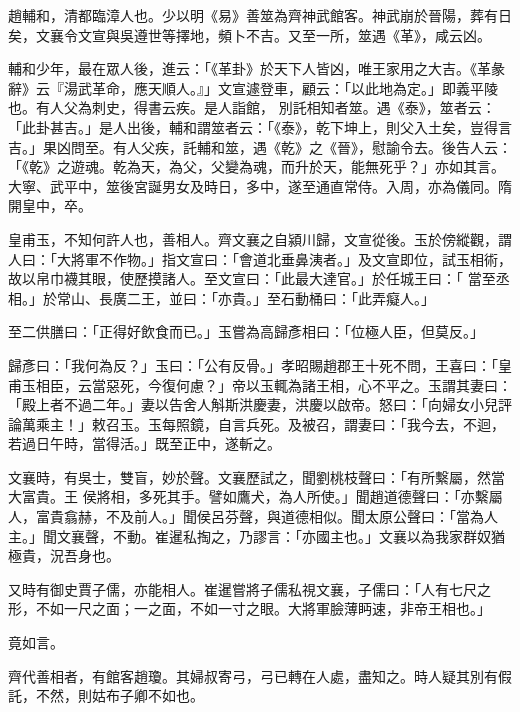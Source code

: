 \begin{pinyinscope}
 趙輔和，清都臨漳人也。少以明《易》善筮為齊神武館客。神武崩於晉陽，葬有日矣，文襄令文宣與吳遵世等擇地，頻卜不吉。又至一所，筮遇《革》，咸云凶。



 輔和少年，最在眾人後，進云：「《革卦》於天下人皆凶，唯王家用之大吉。《革彖辭》云『湯武革命，應天順人。』」文宣遽登車，顧云：「以此地為定。」即義平陵也。有人父為刺史，得書云疾。是人詣館，
 別託相知者筮。遇《泰》，筮者云：「此卦甚吉。」是人出後，輔和謂筮者云：「《泰》，乾下坤上，則父入土矣，豈得言吉。」果凶問至。有人父疾，託輔和筮，遇《乾》之《晉》，慰諭令去。後告人云：「《乾》之遊魂。乾為天，為父，父變為魂，而升於天，能無死乎？」亦如其言。大寧、武平中，筮後宮誕男女及時日，多中，遂至通直常侍。入周，亦為儀同。隋開皇中，卒。



 皇甫玉，不知何許人也，善相人。齊文襄之自潁川歸，文宣從後。玉於傍縱觀，謂人曰：「大將軍不作物。」指文宣曰：「會道北垂鼻洟者。」及文宣即位，試玉相術，故以帛巾襪其眼，使歷摸諸人。至文宣曰：「此最大達官。」於任城王曰：「
 當至丞相。」於常山、長廣二王，並曰：「亦貴。」至石動桶曰：「此弄癡人。」



 至二供膳曰：「正得好飲食而已。」玉嘗為高歸彥相曰：「位極人臣，但莫反。」



 歸彥曰：「我何為反？」玉曰：「公有反骨。」孝昭賜趙郡王十死不問，王喜曰：「皇甫玉相臣，云當惡死，今復何慮？」帝以玉輒為諸王相，心不平之。玉謂其妻曰：「殿上者不過二年。」妻以告舍人斛斯洪慶妻，洪慶以啟帝。怒曰：「向婦女小兒評論萬乘主！」敕召玉。玉每照鏡，自言兵死。及被召，謂妻曰：「我今去，不迴，若過日午時，當得活。」既至正中，遂斬之。



 文襄時，有吳士，雙盲，妙於聲。文襄歷試之，聞劉桃枝聲曰：「有所繫屬，然當大富貴。王
 侯將相，多死其手。譬如鷹犬，為人所使。」聞趙道德聲曰：「亦繫屬人，富貴翕赫，不及前人。」聞侯呂芬聲，與道德相似。聞太原公聲曰：「當為人主。」聞文襄聲，不動。崔暹私掏之，乃謬言：「亦國主也。」文襄以為我家群奴猶極貴，況吾身也。



 又時有御史賈子儒，亦能相人。崔暹嘗將子儒私視文襄，子儒曰：「人有七尺之形，不如一尺之面；一之面，不如一寸之眼。大將軍臉薄眄速，非帝王相也。」



 竟如言。



 齊代善相者，有館客趙瓊。其婦叔寄弓，弓已轉在人處，盡知之。時人疑其別有假託，不然，則姑布子卿不如也。




\end{pinyinscope}
